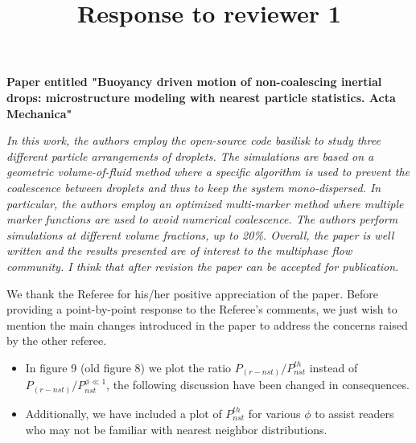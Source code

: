 \documentclass[10pt,a4paper]{article}
\begin{document}
\title{Response to reviewer 1} 
\maketitle
\textbf{Paper entitled "Buoyancy driven motion of non-coalescing inertial drops: microstructure modeling with nearest particle statistics.
Acta Mechanica"}
\bigskip

\textit{In this work, the authors employ the open-source code basilisk to study three different particle arrangements of droplets. The simulations are based on a geometric volume-of-fluid method where a specific algorithm is used to prevent the coalescence between droplets and thus to keep the system mono-dispersed. In particular, the authors employ an optimized multi-marker method where multiple marker functions are used to avoid numerical coalescence. The authors perform simulations at different volume fractions, up to 20\%. Overall, the paper is well written and the results presented are of interest to the multiphase flow community. I think that after revision the paper can be accepted for publication.}


\color{blue}
We thank the Referee for his/her positive appreciation of the paper. 
Before providing a point-by-point response to the Referee’s comments, we just wish to mention the main changes 
introduced in the paper to address the concerns raised by the other referee.
\begin{itemize}
    \item In figure 9 (old figure 8) we plot the ratio $P_{(r-nst)}/P_{nst}^{th}$ instead of $P_{(r-nst)}/P_{nst}^{\phi\ll 1}$, the following discussion have been changed in consequences. 
    \item Additionally, we have included a plot of $P_{nst}^{th}$ for various $\phi$ to assist readers who may not be familiar with nearest neighbor distributions. 
\end{itemize}

\end{document}
